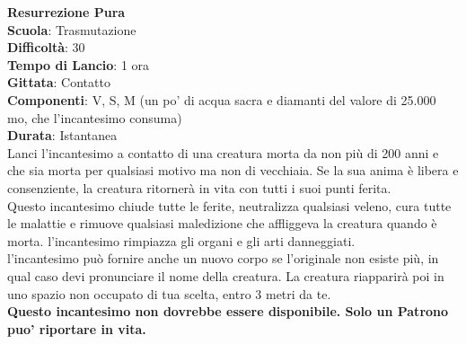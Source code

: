 \begin{multicols}{2}
\medskip\textbf{Resurrezione Pura}\\
\textbf{Scuola}: Trasmutazione\\
\textbf{Difficoltà}:  30\\
\textbf{Tempo di Lancio}: 1 ora\\
\textbf{Gittata}: Contatto\\
\textbf{Componenti}: V, S, M (un po’ di acqua sacra e diamanti del valore di 25.000 mo, che l'incantesimo consuma)\\
\textbf{Durata}: Istantanea\\
Lanci l'incantesimo a contatto di una creatura morta da non più di 200 anni e che sia morta per qualsiasi motivo ma non di vecchiaia. Se la sua anima è libera e consenziente, la creatura ritornerà in vita con tutti i suoi punti ferita. \\
Questo incantesimo chiude tutte le ferite, neutralizza qualsiasi veleno, cura tutte le malattie e rimuove qualsiasi maledizione che affliggeva la creatura quando è morta. l'incantesimo rimpiazza gli organi e gli arti danneggiati.\\
l'incantesimo può fornire anche un nuovo corpo se l’originale non esiste più, in qual caso devi pronunciare il nome della creatura. La creatura riapparirà poi in uno spazio non occupato di tua scelta, entro 3 metri da te. \\
\textbf{Questo incantesimo non dovrebbe essere disponibile. Solo un Patrono puo' riportare in vita.}


\end{multicols}
